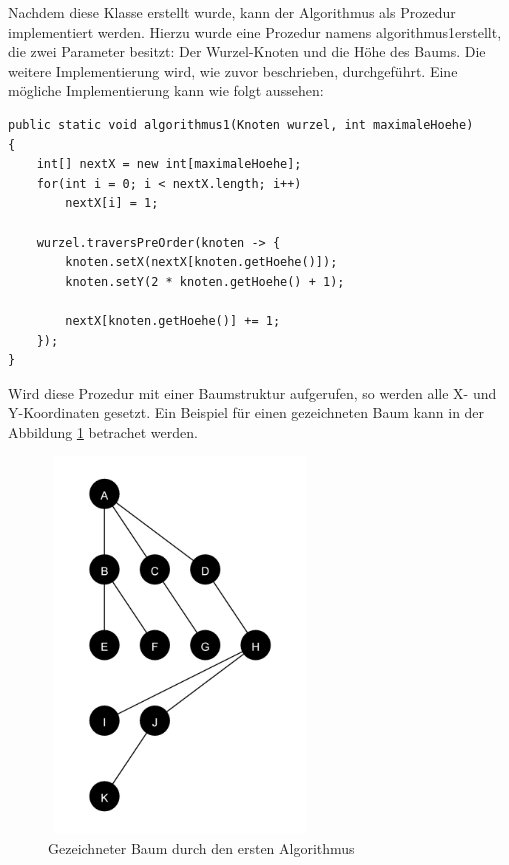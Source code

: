 Nachdem diese Klasse erstellt wurde, kann der Algorithmus als Prozedur implementiert werden.
Hierzu wurde eine Prozedur namens \glqq algorithmus1\grqq erstellt, die zwei Parameter besitzt: Der Wurzel-Knoten
und die Höhe des Baums. Die weitere Implementierung wird, wie zuvor beschrieben, durchgeführt. Eine mögliche Implementierung
kann wie folgt aussehen:

\begin{lstlisting}[caption=Implementierung des naiven Algorithmus]
public static void algorithmus1(Knoten wurzel, int maximaleHoehe) 
{
	int[] nextX = new int[maximaleHoehe];
	for(int i = 0; i < nextX.length; i++)
		nextX[i] = 1;
	
	wurzel.traversPreOrder(knoten -> {
		knoten.setX(nextX[knoten.getHoehe()]);
		knoten.setY(2 * knoten.getHoehe() + 1);
		
		nextX[knoten.getHoehe()] += 1;
	});
}
\end{lstlisting}

Wird diese Prozedur mit einer Baumstruktur aufgerufen, so werden alle X- und Y-Koordinaten gesetzt.
Ein Beispiel für einen gezeichneten Baum kann in der Abbildung \ref{pic:baum_algo_1} betrachet werden.

\begin{figure}[H]
    \centering
    \includegraphics[width=7cm, height=10cm]{abbildungen/baum_algo_1}
    \caption{Gezeichneter Baum durch den ersten Algorithmus}
    \label{pic:baum_algo_1} 
\end{figure}

